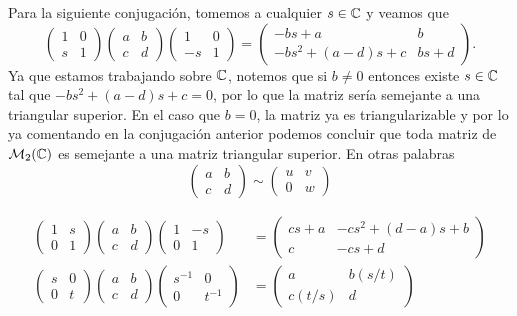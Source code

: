 Para la siguiente conjugación, tomemos a cualquier $s \in \mathbb{C}$ y veamos que
\begin{equation}
  \begin{pmatrix} 1 & 0 \\ s & 1 \end{pmatrix}
  \begin{pmatrix} a & b \\ c & d \end{pmatrix}
  \begin{pmatrix} 1 & 0 \\ -s & 1 \end{pmatrix}
    = \begin{pmatrix} -bs+a & b \\ -bs^2 + (a-d)s + c  & bs+d \end{pmatrix}. \label{eq:ConjII}
\end{equation}
Ya que estamos trabajando sobre $\mathbb{C}$, notemos que si $b \neq 0$ entonces existe $s \in \mathbb{C}$ tal que $-bs^2 + (a-d)s + c = 0$, por lo que la matriz sería semejante a una triangular superior. En el caso que $b = 0$, la matriz ya es triangularizable y por lo ya comentando en la conjugación anterior podemos concluir que toda matriz de $\mathcal{M}_2(\mathbb{C})$ es semejante a una matriz triangular superior. En otras palabras
\[ 
    \begin{pmatrix} a & b \\ c & d \end{pmatrix} \sim \begin{pmatrix} u & v \\ 0 & w \end{pmatrix}
\]

\begin{align}
  \begin{pmatrix} 1 & s \\ 0 & 1 \end{pmatrix}
  \begin{pmatrix} a & b \\ c & d \end{pmatrix}
  \begin{pmatrix} 1 & -s \\ 0 & 1 \end{pmatrix}
    &= \begin{pmatrix} cs+a & -cs^2 + (d-a)s + b \\ c & -cs+d \end{pmatrix}
      \\
  \begin{pmatrix} s & 0 \\ 0 & t \end{pmatrix}
  \begin{pmatrix} a & b \\ c & d \end{pmatrix}
  \begin{pmatrix} s^{-1} & 0 \\ 0 & t^{-1} \end{pmatrix}
    &= \begin{pmatrix} a & b(s/t) \\ c(t/s) & d \end{pmatrix}
\end{align}